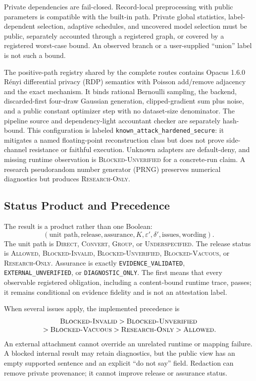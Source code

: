 \documentclass[letterpaper]{article} %
\newcommand{\Direct}{\textsc{Direct}}
\newcommand{\Convert}{\textsc{Convert}}
\newcommand{\Group}{\textsc{Group}}
\newcommand{\Under}{\textsc{Underspecified}}
\newcommand{\Allowed}{\textsc{Allowed}}
\begin{document}
Private dependencies are fail-closed.  Record-local preprocessing with public
parameters is compatible with the built-in path.  Private global statistics,
label-dependent selection, adaptive schedules, and uncovered model selection
must be public, separately accounted through a registered graph, or covered by
a registered worst-case bound.  An observed branch or a user-supplied
``union'' label is not such a bound.

The positive-path registry shared by the complete routes contains Opacus
1.6.0 R\'enyi differential privacy (RDP) semantics with Poisson add/remove
adjacency and the exact
 mechanism.  It binds rational
Bernoulli sampling, the  backend,
discarded-first four-draw Gaussian generation, clipped-gradient sum plus
noise, and a public constant optimizer step with no dataset-size denominator.
The pipeline source and dependency-light accountant checker are separately
hash-bound.  This configuration is labeled
\texttt{known\_attack\_hardened\_secure}: it mitigates a named
floating-point reconstruction class but does not prove
side-channel resistance or faithful execution.  Unknown adapters are
default-deny, and missing runtime observation is
\textsc{Blocked-Unverified} for a concrete-run claim.  A research pseudorandom
number generator (PRNG) preserves numerical diagnostics but produces
\textsc{Research-Only}.

\subsection{Status Product and Precedence}

The result is a product rather than one Boolean:
\[
  (\text{unit path},\text{release},\text{assurance},
    K,\varepsilon',\delta',\text{issues},\text{wording}).
\]
The unit path is \Direct{}, \Convert{}, \Group{}, or \Under{}.  The release
status is \Allowed{}, \textsc{Blocked-Invalid},
\textsc{Blocked-Unverified}, \textsc{Blocked-Vacuous}, or
\textsc{Research-Only}.  Assurance is exactly
\texttt{EVIDENCE\_VALIDATED}, \texttt{EXTERNAL\_UNVERIFIED}, or
\texttt{DIAGNOSTIC\_ONLY}.  The first means that every observable registered
obligation, including a content-bound runtime trace, passes; it remains
conditional on evidence fidelity and is not an attestation label.

When several issues apply, the implemented precedence is
\[
\begin{array}{c}
\textsc{Blocked-Invalid}>\textsc{Blocked-Unverified}\\
{}>\textsc{Blocked-Vacuous}>\textsc{Research-Only}>\textsc{Allowed}.
\end{array}
\]
An external attachment cannot override an unrelated runtime or mapping
failure.  A blocked internal result may retain diagnostics, but the public
view has an empty supported sentence and an explicit ``do not say'' field.
Redaction can remove private provenance; it cannot improve release or
assurance status.
\end{document}
